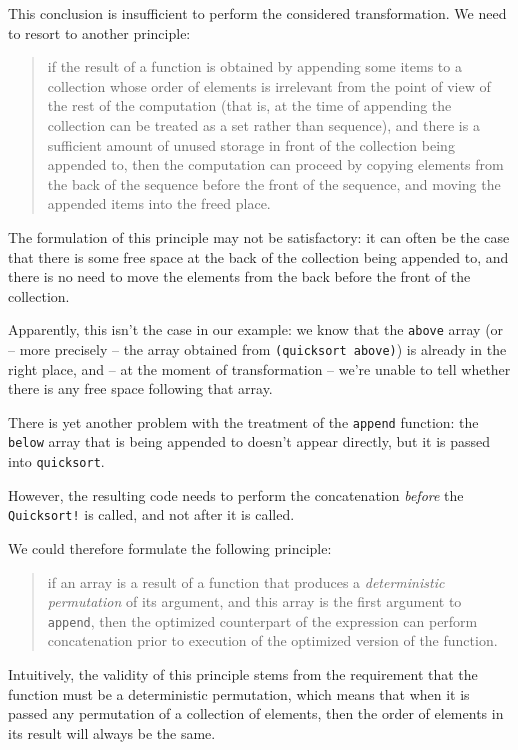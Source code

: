 This conclusion is insufficient to perform the considered transformation.
We need to resort to another principle:

\begin{quote}
  if the result of a function is obtained by appending some items
  to a collection whose order of elements is irrelevant from the
  point of view of the rest of the computation (that is, at the time
  of appending the collection can be treated as a set rather than
  sequence), and there is a sufficient amount of unused storage
  in front of the collection being appended to, then the computation
  can proceed by copying elements from the back of the sequence
  before the front of the sequence, and moving the appended items into
  the freed place.
\end{quote}

The formulation of this principle may not be satisfactory: it can
often be the case that there is some free space at the back of
the collection being appended to, and there is no need to
move the elements from the back before the front of the collection.

Apparently, this isn't the case in our example: we know that
the \texttt{above} array (or -- more precisely -- the array
obtained from \texttt{(quicksort above)}) is already in the right
place, and -- at the moment of transformation -- we're unable to
tell whether there is any free space following that array.

There is yet another problem with the treatment of the \texttt{append}
function: the \texttt{below} array that is being appended to
doesn't appear directly, but it is passed into \texttt{quicksort}.

However, the resulting code needs to perform the concatenation
\textit{before} the \texttt{Quicksort!} is called, and not after
it is called.

We could therefore formulate the following principle:

\begin{quote}
  if an array is a result of a function that produces
  a \textit{deterministic permutation} of its argument,
  and this array is the first argument to \texttt{append},
  then the optimized counterpart of the expression can
  perform concatenation prior to execution of the
  optimized version of the function.
\end{quote}

Intuitively, the validity of this principle stems from the requirement
that the function must be a deterministic permutation, which means
that when it is passed any permutation of a collection of elements,
then the order of elements in its result will always be the same.

